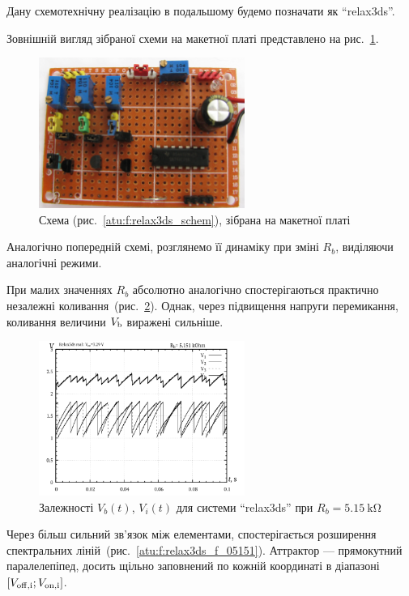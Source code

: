 Дану схемотехнічну реалізацію в подальшому будемо позначати як ``relax3ds''.

Зовнішній вигляд зібраної схеми на макетної платі
представлено на рис.~\ref{atu:f:relax3ds_board}.

\begin{figure}[htb!]
  \centerline{\includegraphics[width=0.6\textwidth]{p/relax3ds_board.jpg} }
\caption{Схема (рис.~\ref{atu:f:relax3ds_schem}), зібрана на макетної платі}
\label{atu:f:relax3ds_board}
\end{figure}

Аналогічно попередній схемі, розглянемо її динаміку при зміні
$ R_b $, виділяючи аналогічні режими.

При малих значеннях
$ R_b $ абсолютно аналогічно спостерігаються практично незалежні
коливання~(рис.~\ref{atu:f:relax3ds_t_05151}). Однак, через підвищення напруги
перемикання, коливання величини
$ V _\mathrm{b} $ виражені сильніше.

\begin{figure}[htb!]
  \centerline{\includegraphics[width=0.6\textwidth]{p/relax3ds_t_005151.png} }
\caption{Залежності $ V_b (t) $, $ V_i (t) $ для системи ``relax3ds'' при $ R_b = \SI{5.15}{\kilo \ohm} $}
  \label{atu:f:relax3ds_t_05151}
\end{figure}


Через більш сильний зв'язок між елементами, спостерігається
розширення спектральних ліній~(рис.~\ref{atu:f:relax3ds_f_05151}). Аттрактор
--- прямокутний паралелепіпед, досить щільно заповнений по кожній
координаті в діапазоні
$ [V _\mathrm{off, i}; V _\mathrm{on, i}] $.



